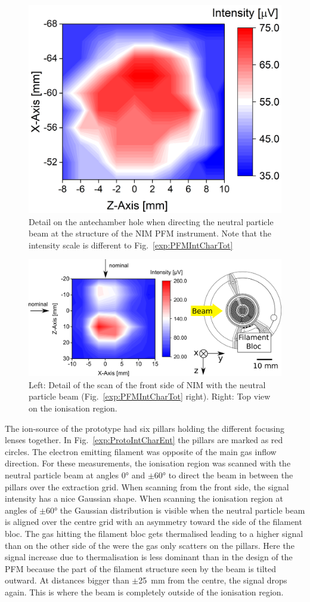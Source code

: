 	\begin{figure}[h!]
		\centering
		\includegraphics[width=.6\textwidth]{Experiments/2D_scan_Ant.png}
		\caption{Detail on the antechamber hole when directing the neutral particle beam at the structure of the NIM PFM instrument. Note that the intensity scale is different to Fig.~\ref{exp:PFMIntCharTot}}
		\label{exp:PFMIntCharAnt}
	\end{figure}	
	\begin{figure}[h!]
		\centering
		\includegraphics[width=\textwidth]{Experiments/2D_scan_Entr.png}
		\caption{Left: Detail of the scan of the front side of NIM with the neutral particle beam (Fig.~\ref{exp:PFMIntCharTot} right). Right: Top view on the ionisation region.}
		\label{exp:PFMIntCharEnt}
	\end{figure}
	\pagebreak
	The ion-source of the prototype had six pillars holding the different focusing lenses together. In Fig.~\ref{exp:ProtoIntCharEnt} the pillars are marked as red circles. The electron emitting filament was opposite of the main gas inflow direction. For these measurements, the ionisation region was scanned with the neutral particle beam at angles 0° and $\pm$60° to direct the beam in between the pillars over the extraction grid. When scanning from the front side, the signal intensity has a nice Gaussian shape. When scanning the ionisation region at angles of $\pm$60° the Gaussian distribution is visible when the neutral particle beam is aligned over the centre grid with an asymmetry toward the side of the filament bloc. The gas hitting the filament bloc gets thermalised leading to a higher signal than on the other side of the were the gas only scatters on the pillars. Here the signal increase due to thermalisation is less dominant than in the design of the PFM because the part of the filament structure seen by the beam is tilted outward. At distances bigger than $\pm$25~mm from the centre, the signal drops again. This is where the beam is completely outside of the ionisation region.
